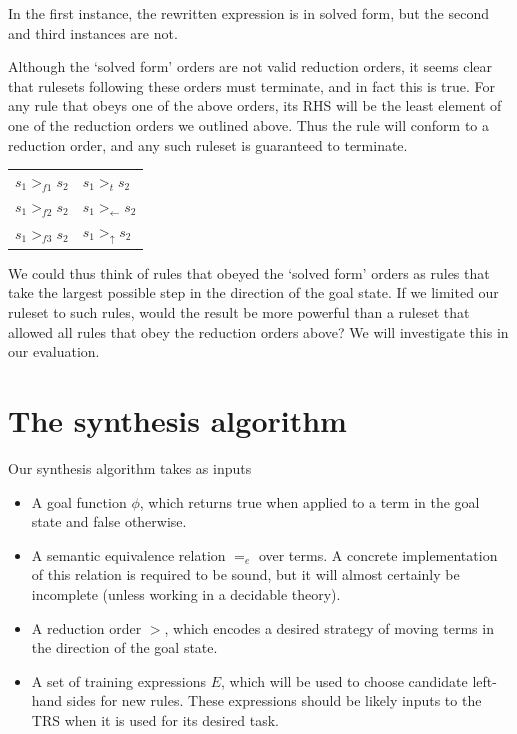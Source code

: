 In the first instance, the rewritten expression is in solved form, but the second and third instances are not.

Although the `solved form' orders are not valid reduction orders, it seems clear that rulesets following these orders must terminate, and in fact this is true. For any rule that obeys one of the above orders, its RHS will be the least element of one of the reduction orders we outlined above. Thus the rule will conform to a reduction order, and any such ruleset is guaranteed to terminate.

\begin{tabular}{l|l}
$s_1 >_{f1} s_2$ & $s_1 >_{t} s_2$ \\
$s_1 >_{f2} s_2$ & $s_1 >_{\leftarrow} s_2$ \\
$s_1 >_{f3} s_2$ & $s_1 >_{\uparrow} s_2$
\end{tabular}

We could thus think of rules that obeyed the `solved form' orders as rules that take the largest possible step in the direction of the goal state. If we limited our ruleset to such rules, would the result be more powerful than a ruleset that allowed all rules that obey the reduction orders above? We will investigate this in our evaluation.

\section{The synthesis algorithm}

Our synthesis algorithm takes as inputs 

\begin{itemize}
\item A goal function $\phi$, which returns true when applied to a term in the goal state and false otherwise. 
\item A semantic equivalence relation $=_e$ over terms. A concrete implementation of this relation is required to be sound, but it will almost certainly be incomplete (unless working in a decidable theory).
\item A reduction order $>$, which encodes a desired strategy of moving terms in the direction of the goal state.
\item A set of training expressions $E$, which will be used to choose candidate left-hand sides for new rules. These expressions should be likely inputs to the TRS when it is used for its desired task.
\end{itemize}

